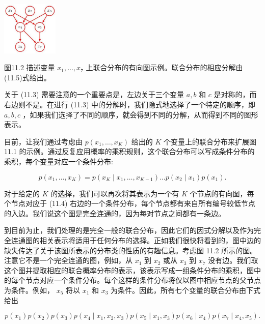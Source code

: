 \documentclass[10pt]{report}
\begin{document}
\begin{center}
\includegraphics[max width=0.2\textwidth]{images/0194e279-9b28-703a-88f4-c3ac21e2010d_347_1211_345_342_328_0.jpg}
\end{center}
\hspace*{3em} 

图11.2 描述变量 \({x}_{1},\ldots ,{x}_{7}\) 上联合分布的有向图示例。联合分布的相应分解由(11.5)式给出。

关于 (11.3) 需要注意的一个重要点是，左边关于三个变量 \(a,b\) 和 \(c\) 是对称的，而右边则不是。在进行 (11.3) 中的分解时，我们隐式地选择了一个特定的顺序，即 \(a,b,c\) ，如果我们选择了不同的顺序，就会得到不同的分解，从而得到不同的图形表示。

目前，让我们通过考虑由 \(p\left( {{x}_{1},\ldots ,{x}_{K}}\right)\) 给出的 \(K\) 个变量上的联合分布来扩展图 11.1 的示例。通过反复应用概率的乘积规则，这个联合分布可以写成条件分布的乘积，每个变量对应一个条件分布:

\[
p\left( {{x}_{1},\ldots ,{x}_{K}}\right)  = p\left( {{x}_{K} \mid  {x}_{1},\ldots ,{x}_{K - 1}}\right) \ldots p\left( {{x}_{2} \mid  {x}_{1}}\right) p\left( {x}_{1}\right) . \tag{11.4}
\]

对于给定的 \(K\) 的选择，我们可以再次将其表示为一个有 \(K\) 个节点的有向图，每个节点对应于 (11.4) 右边的一个条件分布，每个节点都有来自所有编号较低节点的入边。我们说这个图是完全连通的，因为每对节点之间都有一条边。

到目前为止，我们处理的是完全一般的联合分布，因此它们的因式分解以及作为完全连通图的相关表示将适用于任何分布的选择。正如我们很快将看到的，图中边的缺失传达了关于该图所表示的分布类的性质的有趣信息。考虑图 11.2 所示的图。注意它不是一个完全连通的图，例如，从 \({x}_{1}\) 到 \({x}_{2}\) 或从 \({x}_{3}\) 到 \({x}_{7}\) 没有边。我们取这个图并提取相应的联合概率分布的表示，该表示写成一组条件分布的乘积，图中的每个节点对应一个条件分布。每个这样的条件分布将仅以图中相应节点的父节点为条件。例如， \({x}_{5}\) 将以 \({x}_{1}\) 和 \({x}_{3}\) 为条件。因此，所有七个变量的联合分布由下式给出

\[
p\left( {x}_{1}\right) p\left( {x}_{2}\right) p\left( {x}_{3}\right) p\left( {{x}_{4} \mid  {x}_{1},{x}_{2},{x}_{3}}\right) p\left( {{x}_{5} \mid  {x}_{1},{x}_{3}}\right) p\left( {{x}_{6} \mid  {x}_{4}}\right) p\left( {{x}_{7} \mid  {x}_{4},{x}_{5}}\right) . \tag{11.5}
\]
\end{document}
